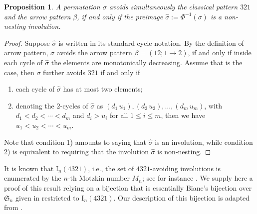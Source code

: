 \documentclass[12pt]{amsart}
\numberwithin{equation}{section}
\theoremstyle{plain}
\newtheorem{proposition}[theorem]{Proposition}
\def\fS{\mathfrak{S}}
\def\rI{\mathrm{I}}
\begin{document}
\begin{proposition}\label{prop:char 321-beta}
A permutation $\sigma$ avoids simultaneously the classical pattern $321$ and the arrow pattern $\beta$, if and only if the preimage $\hat{\sigma}:=\Phi^{-1}(\sigma)$ is a non-nesting involution.
\end{proposition}
\begin{proof}
Suppose $\hat{\sigma}$ is written in its standard cycle notation. By the definition of arrow pattern, $\sigma$ avoids the arrow pattern $\beta=(12;1\to 2)$, if and only if inside each cycle of $\hat{\sigma}$ the elements are monotonically decreasing. Assume that is the case, then $\sigma$ further avoids $321$ if and only if 
\begin{enumerate}[1)]
\item each cycle of $\hat{\sigma}$ has at most two elements;
\item denoting the $2$-cycles of $\hat{\sigma}$ as $(d_1\,u_1),(d_2\,u_2),\ldots,(d_m\,u_m)$, with $d_1<d_2<\cdots<d_m$ and $d_i>u_i$ for all $1\le i\le m$, then we have $u_1<u_2<\cdots<u_m$.
\end{enumerate}
Note that condition 1) amounts to saying that $\hat{\sigma}$ is an involution, while condition 2) is equivalent to requiring that the involution $\hat{\sigma}$ is non-nesting.
\end{proof}

It is known that $\rI_n(4321)$, i.e., the set of $4321$-avoiding involutions is enumerated by the $n$-th Motzkin number $M_n$; see for instance \cite{Gui1995,Jag2003}. We supply here a proof of this result relying on a bijection that is essentially Biane's bijection over $\fS_n$ given in \cite{Bia1993} restricted to $\rI_n(4321)$. Our description of this bijection is adapted from \cite[Theorem~3]{BBS2011}.
\end{document}
